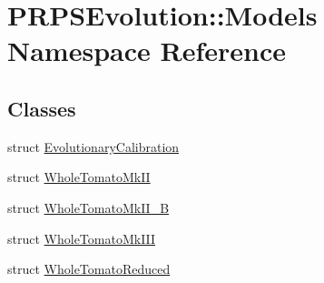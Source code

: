 \hypertarget{namespace_p_r_p_s_evolution_1_1_models}{\section{\-P\-R\-P\-S\-Evolution\-:\-:\-Models \-Namespace \-Reference}
\label{namespace_p_r_p_s_evolution_1_1_models}
}
\subsection*{\-Classes}
\begin{DoxyCompactItemize}
\item 
struct \hyperlink{struct_p_r_p_s_evolution_1_1_models_1_1_evolutionary_calibration}{\-Evolutionary\-Calibration}
\item 
struct \hyperlink{struct_p_r_p_s_evolution_1_1_models_1_1_whole_tomato_mk_i_i}{\-Whole\-Tomato\-Mk\-I\-I}
\item 
struct \hyperlink{struct_p_r_p_s_evolution_1_1_models_1_1_whole_tomato_mk_i_i___b}{\-Whole\-Tomato\-Mk\-I\-I\-\_\-\-B}
\item 
struct \hyperlink{struct_p_r_p_s_evolution_1_1_models_1_1_whole_tomato_mk_i_i_i}{\-Whole\-Tomato\-Mk\-I\-I\-I}
\item 
struct \hyperlink{struct_p_r_p_s_evolution_1_1_models_1_1_whole_tomato_reduced}{\-Whole\-Tomato\-Reduced}
\end{DoxyCompactItemize}
